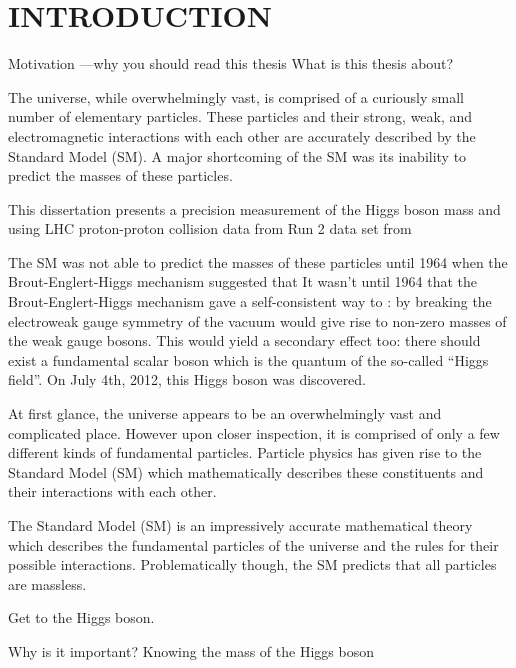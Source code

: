\chapter{INTRODUCTION}

Motivation ---why you should read this thesis
What is this thesis about?


The universe, while overwhelmingly vast, is comprised of a curiously small number of elementary particles.
These particles and their strong, weak, and electromagnetic interactions with each other are accurately described by the Standard Model (SM).
A major shortcoming of the SM was its inability to predict the masses of these particles.

This dissertation presents a precision measurement of the Higgs boson mass and using LHC proton-proton collision data from Run 2  data set from  

The SM was not able to predict the masses of these particles until 1964 when the Brout-Englert-Higgs mechanism suggested that 
It wasn't until 1964 that the Brout-Englert-Higgs mechanism gave a self-consistent way to :
by breaking the electroweak gauge symmetry of the vacuum would give rise to non-zero masses of the weak gauge bosons.
This would yield a secondary effect too:
there should exist a fundamental scalar boson which is the quantum of the so-called ``Higgs field''.
On July 4th, 2012, this Higgs boson was discovered.

At first glance, the universe appears to be an overwhelmingly vast and complicated place.
However upon closer inspection, it is comprised of only a few different kinds of fundamental particles.
Particle physics has given rise to the Standard Model (SM) which mathematically describes these constituents and their interactions with each other.




The Standard Model (SM) is an impressively accurate mathematical theory which describes the fundamental particles of the universe and the rules for their possible interactions.
Problematically though, the SM predicts that all particles are massless.


Get to the Higgs boson.

Why is it important?
Knowing the mass of the Higgs boson 








